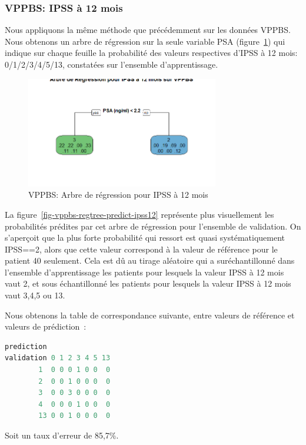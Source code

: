 %
%

%

\subsubsection{VPPBS: IPSS à 12 mois}

Nous appliquons la même méthode que précédemment sur les données VPPBS.
Nous obtenons un arbre de régression sur la seule variable PSA (figure~\ref{fig-vppbs-regtree-ipss12}) qui indique sur chaque feuille la probabilité des valeurs respectives d'IPSS à 12 mois: 0/1/2/3/4/5/13, constatées sur l'ensemble d'apprentissage.

\begin{figure}[H]
\centering
\includegraphics[width=0.75\textwidth]{../Fig/VPPBS/vppbs-regtree-ipss12.png}
\caption{VPPBS: Arbre de régression pour IPSS à 12 mois}
\label{fig-vppbs-regtree-ipss12}
\end{figure}

La figure~\ref{fig-vppbs-regtree-predict-ipss12} représente plus visuellement les probabilités prédites par cet arbre de régression pour l'ensemble de validation. On s'aperçoit que la plus forte probabilité qui ressort est quasi systématiquement
IPSS==2, alors que cette valeur correspond à la valeur de référence pour le patient 40 seulement. Cela est dû au tirage aléatoire qui a suréchantillonné dans l'ensemble d'apprentissage les patients pour lesquels la valeur IPSS à 12 mois vaut 2, et sous échantillonné les patients pour lesquels la valeur IPSS à 12 mois vaut 3,4,5 ou 13.

Nous obtenons la table de correspondance suivante, entre valeurs de référence et valeurs de prédiction~:

\begin{lstlisting}[language=R]
          prediction
validation 0 1 2 3 4 5 13
        1  0 0 0 1 0 0  0
        2  0 0 1 0 0 0  0
        3  0 0 3 0 0 0  0
        4  0 0 0 1 0 0  0
        13 0 0 1 0 0 0  0
\end{lstlisting}
Soit un taux d'erreur de 85,7\%.

